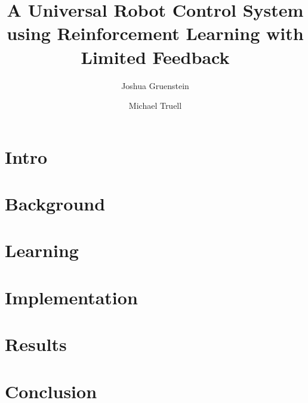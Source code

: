 \documentclass[letterpaper,11pt]{article}
\title{A Universal Robot Control System using Reinforcement Learning with Limited Feedback}
\author{Joshua Gruenstein \and Michael Truell}
\begin{document}
\maketitle



\pagebreak

\section{Intro}



\section{Background}



\section{Learning}



\section{Implementation}



\section{Results}



\section{Conclusion}



\nocite{*}

\pagebreak


\end{document}
